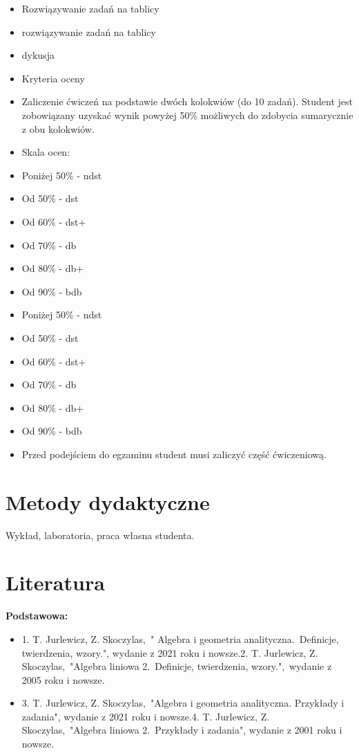 \documentclass[12pt, a4paper]{article}
\begin{document}
\begin{itemize}
  \item Rozwiązywanie zadań na tablicy
  \item rozwiązywanie zadań na tablicy
  \item dykusja
  \item Kryteria oceny
  \item Zaliczenie ćwiczeń na podstawie dwóch kolokwiów (do 10 zadań). Student jest zobowiązany uzyskać wynik powyżej 50\% możliwych do zdobycia sumarycznie z obu kolokwiów.
  \item Skala ocen:
  \item Poniżej 50\% - ndst
  \item Od 50\% - dst
  \item Od 60\% - dst+
  \item Od 70\% - db
  \item Od 80\% - db+
  \item Od 90\% - bdb
  \item Poniżej 50\% - ndst
  \item Od 50\% - dst
  \item Od 60\% - dst+
  \item Od 70\% - db
  \item Od 80\% - db+
  \item Od 90\% - bdb
  \item Przed podejściem do egzaminu student musi zaliczyć część ćwiczeniową.
\end{itemize}

\section{Metody dydaktyczne}

Wykład, laboratoria, praca własna studenta.

\section{Literatura}

\textbf{Podstawowa:}
\begin{itemize}
  \item 1. T. Jurlewicz, Z. Skoczylas, " Algebra i geometria analityczna. Definicje, twierdzenia, wzory.", wydanie z 2021 roku i nowsze.2. T. Jurlewicz, Z. Skoczylas, "Algebra liniowa 2. Definicje, twierdzenia, wzory.", wydanie z 2005 roku i nowsze.
  \item 3. T. Jurlewicz, Z. Skoczylas, "Algebra i geometria analityczna. Przykłady i zadania", wydanie z 2021 roku i nowsze.4. T. Jurlewicz, Z. Skoczylas, "Algebra liniowa 2. Przykłady i zadania", wydanie z 2001 roku i nowsze.
\end{itemize}
\end{document}
